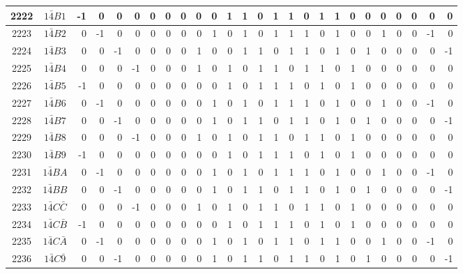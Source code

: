 \documentclass[12 pt]{article}%
\begin{document}
\begin{tiny}
\begin{centering}
\begin{longtable}{|c|c||rrrrrrrrrrrrrrrrrrrrrrrr|}
      \hline
      2222 & $1\bar4B1$ & -1 & 0 & 0 & 0 & 0 & 0 & 0 & 0 & 0 & 1 & 1 & 0 & 1 & 1 & 0 & 1 & 1 & 0 & 0 & 0 & 0 & 0 & 0 & 0 \\
      \hline
      2223 & $1\bar4B2$ & 0 & -1 & 0 & 0 & 0 & 0 & 0 & 0 & 1 & 0 & 1 & 0 & 1 & 1 & 1 & 0 & 1 & 0 & 0 & 1 & 0 & 0 & -1 & 0 \\
      \hline
      2224 & $1\bar4B3$ & 0 & 0 & -1 & 0 & 0 & 0 & 0 & 1 & 0 & 0 & 1 & 1 & 0 & 1 & 1 & 0 & 1 & 0 & 1 & 0 & 0 & 0 & 0 & -1 \\
      \hline
      2225 & $1\bar4B4$ & 0 & 0 & 0 & -1 & 0 & 0 & 0 & 1 & 0 & 1 & 0 & 1 & 1 & 0 & 1 & 1 & 0 & 1 & 0 & 0 & 0 & 0 & 0 & 0 \\
      \hline
      2226 & $1\bar4B5$ & -1 & 0 & 0 & 0 & 0 & 0 & 0 & 0 & 0 & 1 & 0 & 1 & 1 & 1 & 0 & 1 & 0 & 1 & 0 & 0 & 0 & 0 & 0 & 0 \\
      \hline
      2227 & $1\bar4B6$ & 0 & -1 & 0 & 0 & 0 & 0 & 0 & 0 & 1 & 0 & 1 & 0 & 1 & 1 & 1 & 0 & 1 & 0 & 0 & 1 & 0 & 0 & -1 & 0 \\
      \hline
      2228 & $1\bar4B7$ & 0 & 0 & -1 & 0 & 0 & 0 & 0 & 0 & 1 & 0 & 1 & 1 & 0 & 1 & 1 & 0 & 1 & 0 & 1 & 0 & 0 & 0 & 0 & -1 \\
      \hline
      2229 & $1\bar4B8$ & 0 & 0 & 0 & -1 & 0 & 0 & 0 & 1 & 0 & 1 & 0 & 1 & 1 & 0 & 1 & 1 & 0 & 1 & 0 & 0 & 0 & 0 & 0 & 0 \\
      \hline
      2230 & $1\bar4B9$ & -1 & 0 & 0 & 0 & 0 & 0 & 0 & 0 & 0 & 1 & 0 & 1 & 1 & 1 & 0 & 1 & 0 & 1 & 0 & 0 & 0 & 0 & 0 & 0 \\
      \hline
      2231 & $1\bar4BA$ & 0 & -1 & 0 & 0 & 0 & 0 & 0 & 0 & 1 & 0 & 1 & 0 & 1 & 1 & 1 & 0 & 1 & 0 & 0 & 1 & 0 & 0 & -1 & 0 \\
      \hline
      2232 & $1\bar4BB$ & 0 & 0 & -1 & 0 & 0 & 0 & 0 & 0 & 1 & 0 & 1 & 1 & 0 & 1 & 1 & 0 & 1 & 0 & 1 & 0 & 0 & 0 & 0 & -1 \\
      \hline
      2233 & $1\bar4C\bar C$ & 0 & 0 & 0 & -1 & 0 & 0 & 0 & 1 & 0 & 1 & 0 & 1 & 1 & 0 & 1 & 1 & 0 & 1 & 0 & 0 & 0 & 0 & 0 & 0 \\
      \hline
      2234 & $1\bar4C\bar B$ & -1 & 0 & 0 & 0 & 0 & 0 & 0 & 0 & 0 & 1 & 0 & 1 & 1 & 1 & 0 & 1 & 0 & 1 & 0 & 0 & 0 & 0 & 0 & 0 \\
      \hline
      2235 & $1\bar4C\bar A$ & 0 & -1 & 0 & 0 & 0 & 0 & 0 & 0 & 1 & 0 & 1 & 0 & 1 & 1 & 0 & 1 & 1 & 0 & 0 & 1 & 0 & 0 & -1 & 0 \\
      \hline
      2236 & $1\bar4C\bar9$ & 0 & 0 & -1 & 0 & 0 & 0 & 0 & 0 & 1 & 0 & 1 & 1 & 0 & 1 & 1 & 0 & 1 & 0 & 1 & 0 & 0 & 0 & 0 & -1 \\

\end{longtable}
\end{centering}
\end{tiny}
\end{document}
